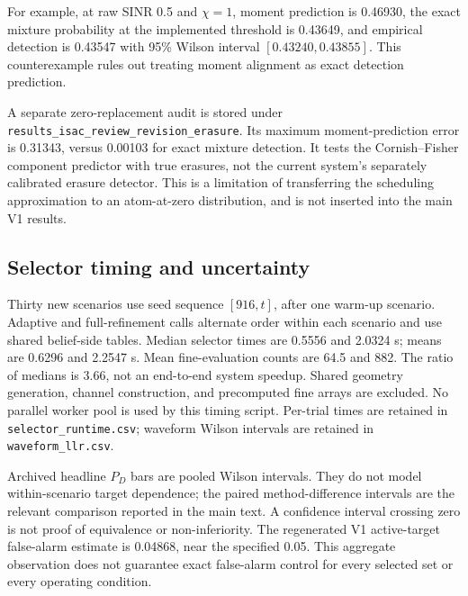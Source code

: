 \documentclass[10pt]{article}
\begin{document}
For example, at raw SINR 0.5 and $\chi=1$, moment prediction is 0.46930,
the exact mixture probability at the implemented threshold is 0.43649,
and empirical detection is 0.43547 with 95\% Wilson interval
$[0.43240,0.43855]$. This counterexample rules out treating moment alignment
as exact detection prediction.

A separate zero-replacement audit is stored under
\texttt{results\_isac\_review\_revision\_erasure}. Its maximum moment-prediction
error is 0.31343, versus 0.00103 for exact mixture detection. It tests the
Cornish--Fisher component predictor with true erasures, not the current
system's separately calibrated erasure detector. This is a limitation of
transferring the scheduling approximation to an atom-at-zero distribution,
and is not inserted into the main V1 results.

\subsection{Selector timing and uncertainty}
Thirty new scenarios use seed sequence $[916,t]$, after one warm-up scenario.
Adaptive and full-refinement calls alternate order within each scenario and
use shared belief-side tables. Median selector times are 0.5556 and 2.0324 s;
means are 0.6296 and 2.2547 s. Mean fine-evaluation counts are 64.5 and 882.
The ratio of medians is 3.66, not an end-to-end system speedup.
Shared geometry generation, channel construction, and precomputed fine arrays
are excluded. No parallel worker pool is used by this timing script.
Per-trial times are retained in \texttt{selector\_runtime.csv}; waveform
Wilson intervals are retained in \texttt{waveform\_llr.csv}.

Archived headline $P_D$ bars are pooled Wilson intervals. They do not model
within-scenario target dependence; the paired method-difference intervals
are the relevant comparison reported in the main text. A confidence interval
crossing zero is not proof of equivalence or non-inferiority. The regenerated
V1 active-target false-alarm estimate is 0.04868, near the specified 0.05.
This aggregate observation does not guarantee exact false-alarm control
for every selected set or every operating condition.
\end{document}
